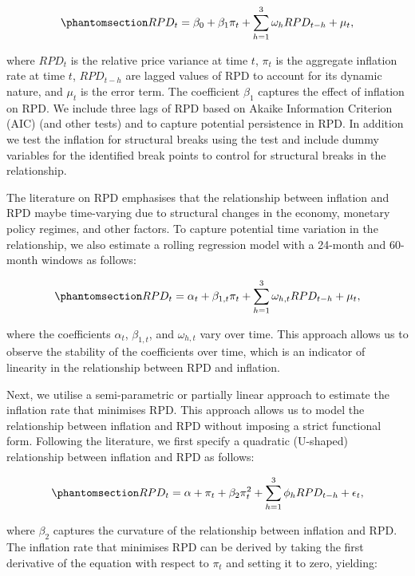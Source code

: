\documentclass[
  letterpaper,
  DIV=11,
  numbers=noendperiod]{scrartcl}
\begin{document}
\begin{equation}\phantomsection\label{eq-rpd_reg}{RPD_{t} = \beta_0 + \beta_1\pi_{t} + \sum_{h=1}^{3}\omega_hRPD_{t-h}  +  \mu_{t}, }\end{equation}

where \(RPD_{t}\) is the relative price variance at time \(t\),
\(\pi_{t}\) is the aggregate inflation rate at time \(t\), \(RPD_{t-h}\)
are lagged values of RPD to account for its dynamic nature, and
\(\mu_{t}\) is the error term. The coefficient \(\beta_1\) captures the
effect of inflation on RPD. We include three lags of RPD based on Akaike
Information Criterion (AIC) (and other tests) and to capture potential
persistence in RPD. In addition we test the inflation for structural
breaks using the \citet{bai1998a} test and include dummy variables for
the identified break points to control for structural breaks in the
relationship.

The literature on RPD emphasises that the relationship between inflation
and RPD maybe time-varying due to structural changes in the economy,
monetary policy regimes, and other factors. To capture potential time
variation in the relationship, we also estimate a rolling regression
model with a 24-month and 60-month windows as follows:

\begin{equation}\phantomsection\label{eq-rpd_rolling_reg}{RPD_{t} = \alpha_{t} + \beta_{1,t}\pi_{t} + \sum_{h=1}^{3}\omega_{h,t}RPD_{t-h}  +  \mu_{t}, }\end{equation}

where the coefficients \(\alpha_{t}\), \(\beta_{1,t}\), and
\(\omega_{h,t}\) vary over time. This approach allows us to observe the
stability of the coefficients over time, which is an indicator of
linearity in the relationship between RPD and inflation.

Next, we utilise a semi-parametric or partially linear approach to
estimate the inflation rate that minimises RPD. This approach allows us
to model the relationship between inflation and RPD without imposing a
strict functional form. Following the literature, we first specify a
quadratic (U-shaped) relationship between inflation and RPD as follows:

\begin{equation}\phantomsection\label{eq-rpd_semi_parametric}{RPD_t = \alpha + \pi_t + \beta_2\pi_t^2 + \sum_{h=1}^{3}\phi_hRPD_{t-h} + \epsilon_t, }\end{equation}

where \(\beta_2\) captures the curvature of the relationship between
inflation and RPD. The inflation rate that minimises RPD can be derived
by taking the first derivative of the equation with respect to \(\pi_t\)
and setting it to zero, yielding:
\end{document}
